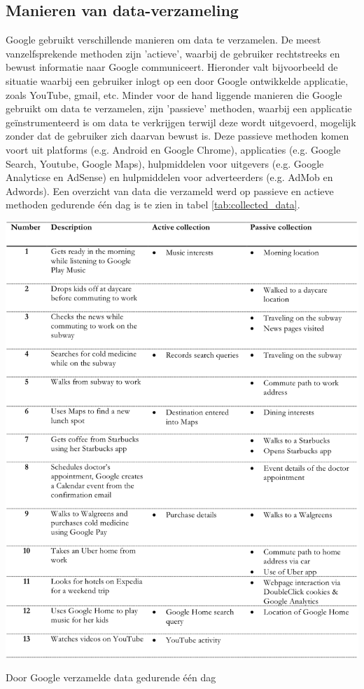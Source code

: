 \subsection{Manieren van data-verzameling} \label{ways-of-data-collection}

Google gebruikt verschillende manieren om data te verzamelen. De meest vanzelfsprekende methoden zijn 'actieve', waarbij de gebruiker rechtstreeks en bewust informatie naar Google communiceert. Hieronder valt bijvoorbeeld de situatie waarbij een gebruiker inlogt op een door Google ontwikkelde applicatie, zoals YouTube, gmail, etc. Minder voor de hand liggende manieren die Google gebruikt om data te verzamelen, zijn 'passieve' methoden, waarbij een applicatie geïnstrumenteerd is om data te verkrijgen terwijl deze wordt uitgevoerd, mogelijk zonder dat de gebruiker zich daarvan bewust is. Deze passieve methoden komen voort uit platforms (e.g. Android en Google Chrome), applicaties (e.g. Google Search, Youtube, Google Maps), hulpmiddelen voor uitgevers (e.g. Google Analyticse en AdSense) en hulpmiddelen voor adverteerders (e.g. AdMob en Adwords). Een overzicht van data die verzameld werd op passieve en actieve methoden gedurende één dag is te zien in tabel \ref{tab:collected_data}.

\begin{table}
    \centering
    \includegraphics[width=1\textwidth]{img/collecteddata.png}
    \caption{Door Google verzamelde data gedurende één dag}
    \label{tab:collected_data}
    \cite{schmidt_google-data-collection}
\end{table}

